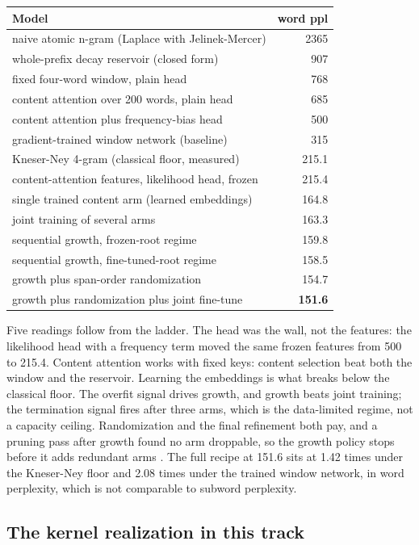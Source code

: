 \documentclass[11pt]{article}
\begin{document}
\begin{center}
\begin{tabular}{lr}
\toprule
Model & word ppl \\
\midrule
naive atomic n-gram (Laplace with Jelinek-Mercer) & 2365 \\
whole-prefix decay reservoir (closed form) & 907 \\
fixed four-word window, plain head & 768 \\
content attention over 200 words, plain head & 685 \\
content attention plus frequency-bias head & 500 \\
gradient-trained window network (baseline) & 315 \\
Kneser-Ney 4-gram (classical floor, measured) & 215.1 \\
content-attention features, likelihood head, frozen & 215.4 \\
single trained content arm (learned embeddings) & 164.8 \\
joint training of several arms & 163.3 \\
sequential growth, frozen-root regime & 159.8 \\
sequential growth, fine-tuned-root regime & 158.5 \\
growth plus span-order randomization & 154.7 \\
growth plus randomization plus joint fine-tune & \textbf{151.6} \\
\bottomrule
\end{tabular}
\end{center}

Five readings follow from the ladder. The head was the wall, not
the features: the likelihood head with a frequency term moved the
same frozen features from 500 to 215.4. Content attention works
with fixed keys: content selection beat both the window and the
reservoir. Learning the embeddings is what breaks below the
classical floor. The overfit signal drives growth, and growth beats
joint training; the termination signal fires after three arms,
which is the data-limited regime, not a capacity ceiling.
Randomization and the final refinement both pay, and a pruning pass
after growth found no arm droppable, so the growth policy stops
before it adds redundant arms \cite{lecun1990}. The full recipe at
151.6 sits at 1.42 times under the Kneser-Ney floor and 2.08 times
under the trained window network, in word perplexity, which is not
comparable to subword perplexity.

\subsection{The kernel realization in this track}
\end{document}
